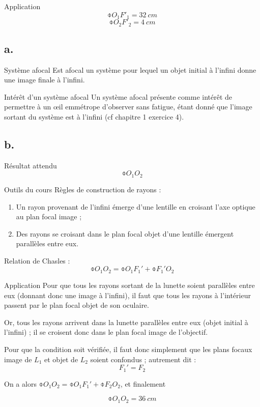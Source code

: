 \documentclass[10pt,a5paper,notitlepage]{book}
\begin{document}
\begin{NCexem}{Application}
    \[ \boxed{\obar{O_1F'_1} = \SI{32}{cm}} \]
    \[ \boxed{\obar{O_2F'_2} = \SI{4}{cm}} \]
\end{NCexem}

\subsection{a.}
\begin{defi}{Système afocal}
    Est afocal un système pour lequel un objet initial à l'infini donne une
    image finale à l'infini.
\end{defi}

\begin{inte}{Intérêt d'un système afocal}
    Un système afocal présente comme intérêt de permettre à un œil emmétrope
    d'observer sans fatigue, étant donné que l'image sortant du système est à
    l'infini (cf chapitre 1 exercice 4).
\end{inte}

\setcounter{subsection}{1}
\subsection{b.}
\begin{NCprop}{Résultat attendu}
    $$\obar{O_1O_2}$$
\end{NCprop}

\begin{NCdemo}{Outils du cours}
    Règles de construction de rayons :
    \begin{enumerate}

        \item Un rayon provenant de l'infini émerge d'une lentille en croisant
            l'axe optique au plan focal image ;

        \item Des rayons se croisant dans le plan focal objet d'une lentille
            émergent parallèles entre eux.
    \end{enumerate}
    Relation de Chasles :
    \[ \obar{O_1O_2} = \obar{O_1F_1'} + \obar{F_1'O_2} \]
\end{NCdemo}

\begin{NCexem}{Application}
    Pour que tous les rayons sortant de la lunette soient parallèles entre eux
    (donnant donc une image à l'infini), il faut que tous les rayons à
    l'intérieur passent par le plan focal objet de son oculaire.\bigbreak

    Or, tous les rayons arrivent dans la lunette parallèles entre eux (objet
    initial à l'infini) ; il se croisent donc dans le plan focal image de
    l'objectif. \bigbreak

    Pour que la condition soit vérifiée, il faut donc simplement que les plans
    focaux image de $L_1$ et objet de $L_2$ soient confondus ; autrement dit :
    \[ \boxed{F_1' = F_2} \]
    
    On a alors $\obar{O_1O_2} = \obar{O_1F_1'} + \obar{F_2O_2}$, et finalement

    \[ \boxed{\obar{O_1O_2} = \SI{+36}{cm}} \]
\end{NCexem}
\end{document}
